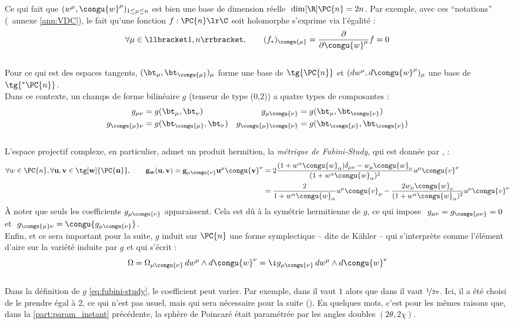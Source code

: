 Ce qui fait que $(w^\mu, \congu{w}^\mu)_{1\leq \mu \leq n}$ est bien une base de dimension réelle $\ \dim[\R]\PC{n} = 2n$. Par exemple, avec ces ``notations'' (\cf~annexe \ref{ann:VDC}), le fait qu'une fonction $f: \PC{n}\lr \C$ soit holomorphe s'exprime via l'égalité :
\[\forall \mu\in\llbracket1,n\rrbracket,\qquad (f_*)_{\congu{\mu}} = \frac{\partial}{\partial \congu{w}^\mu}f = 0\] 
\\
Pour ce qui est des espaces tangents, $(\bt_\mu, \bt_{\congu{\mu}})_\mu$ forme une base de $\tg{\PC{n}}$ et $(dw^\mu, d\congu{w}^\mu)_\mu$ une base de $\tg{^* \PC{n}}$.
\\
Dans ce contexte, un champs de forme bilinéaire $g$ (tenseur de type (0,2)) a quatre types de composantes :
\begin{align*}
	g_{\mu \nu} &= g(\bt_{\mu}, \bt_{\nu})  &  g_{\mu \congu{\nu}} &= g(\bt_{\mu}, \bt_{\congu{\nu}}) \\
	g_{\congu{\mu} \nu} &= g(\bt_{\congu{\mu}}, \bt_{\nu})  &  g_{\congu{\mu} \congu{\nu}} &= g(\bt_{\congu{\mu}}, \bt_{\congu{\nu}})
\end{align*}
\\
L'espace projectif complexe, en particulier, admet un produit hermitien, la \emph{métrique de Fubini-Study}, qui est donnée par \cite[sec. 8.5]{nakahara_geometry_2003}, \cite[chap. 4]{ballmann_lectures_2006} :
\begin{equation} \label{eq:fubini-study}
	\begin{aligned}
		\forall w\in\PC{n}, \forall \bf{u},\bf{v}\in\tg[w]{\PC{n}},\qquad g_w(\bf{u}, \bf{v}) = g_{\mu\congu{\nu}} u^\mu \congu{v}^\nu 
		&= 2\frac{(1+w^\alpha \congu{w}_\alpha)\delta_{\mu\nu} - w_\mu \congu{w}_\nu}{(1+w^\alpha \congu{w}_\alpha)^2}u^\mu \congu{v}^\nu \\
		&= \frac{2}{1+w^\alpha \congu{w}_\alpha} u^\mu \congu{v}_\mu - \frac{2w_\mu \congu{w}_\nu}{(1+w^\alpha \congu{w}_\alpha)^2} u^\mu \congu{v}^\nu
	\end{aligned}
\end{equation}
À noter que seuls les coefficients $g_{\mu \congu{\nu}}$ apparaissent. Cela est dû à la symétrie hermitienne de $g$, ce qui impose $\ g_{\mu\nu} = g_{\congu{\mu\nu}} = 0\ $ et $\ g_{\congu{\mu} \nu} = \congu{g_{\mu \congu{\nu}}}$.
\\
Enfin, et ce sera important pour la suite, $g$ induit sur $\PC{n}$ une forme symplectique -- dite de Kähler -- qui s'interprète comme l'élément d'aire sur la variété induite par $g$ et qui s'écrit :
\[\Omega = \Omega_{\mu\congu{\nu}}\, dw^\mu \wedge d\congu{w}^\nu 
= \i g_{\mu \congu{\nu}}\, dw^\mu \wedge d\congu{w}^\nu\]
\\
Dans la définition de $g$ \eqref{eq:fubini-study}, le coefficient peut varier. Par exemple, dans \cite{nakahara_geometry_2003} il vaut $1$ alors que dans \cite{huybrechts_complex_2005} il vaut $\nicefrac{1}{2\pi}$. 
Ici, il a été choisi de le prendre égal à 2, ce qui n'est pas usuel, mais qui sera nécessaire pour la suite ().
En quelques mots, c'est pour les mêmes raisons que, dans la \cref{part:param_instant} précédente, la sphère de Poincaré était paramétrée par les angles doubles $(2\theta, 2\chi)$.
\skipl





